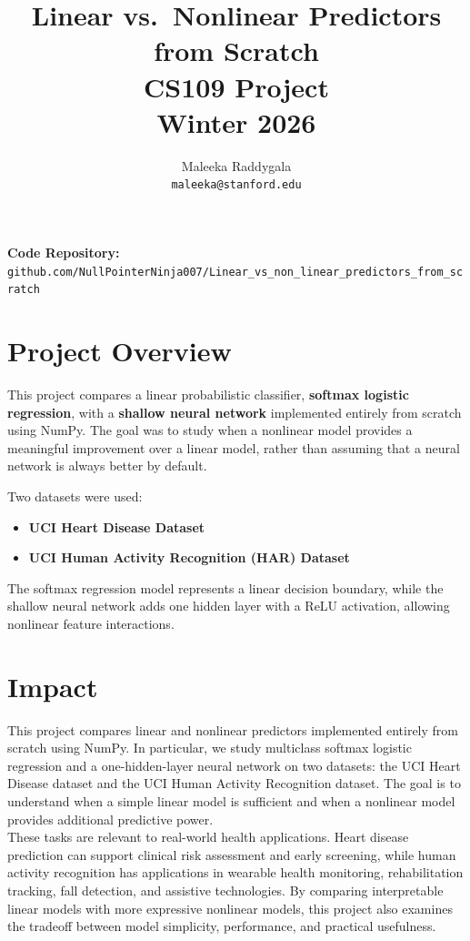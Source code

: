 \documentclass[11pt]{article}
\title{Linear vs.\ Nonlinear Predictors from Scratch \\ \large CS109 Project \\ \large Winter 2026}
\author{Maleeka Raddygala\\ \texttt{maleeka@stanford.edu}}
\date{}
\begin{document}
\maketitle

\noindent\textbf{Code Repository:} \texttt{github.com/NullPointerNinja007/Linear\_vs\_non\_linear\_predictors\_from\_scratch}

\section*{Project Overview}

This project compares a linear probabilistic classifier, \textbf{softmax logistic regression}, with a \textbf{shallow neural network} implemented entirely from scratch using NumPy. The goal was to study when a nonlinear model provides a meaningful improvement over a linear model, rather than assuming that a neural network is always better by default.

Two datasets were used:

\begin{itemize}
    \item \textbf{UCI Heart Disease Dataset}
    \item \textbf{UCI Human Activity Recognition (HAR) Dataset}
\end{itemize}

The softmax regression model represents a linear decision boundary, while the shallow neural network adds one hidden layer with a ReLU activation, allowing nonlinear feature interactions.

\section*{Impact}

This project compares linear and nonlinear predictors implemented entirely from scratch using NumPy. In particular, we study multiclass softmax logistic regression and a one-hidden-layer neural network on two datasets: the UCI Heart Disease dataset and the UCI Human Activity Recognition dataset. The goal is to understand when a simple linear model is sufficient and when a nonlinear model provides additional predictive power. \\

These tasks are relevant to real-world health applications. Heart disease prediction can support clinical risk assessment and early screening, while human activity recognition has applications in wearable health monitoring, rehabilitation tracking, fall detection, and assistive technologies. By comparing interpretable linear models with more expressive nonlinear models, this project also examines the tradeoff between model simplicity, performance, and practical usefulness.
\end{document}
